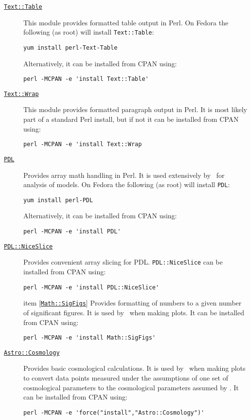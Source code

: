 \begin{description}
  \item [\href{http://search.cpan.org/~anno/Text-Table-1.114/lib/Text/Table.pm}{{\tt Text::Table}}] This module provides formatted table output in Perl. On Fedora the following (as root) will install {\tt Text::Table}:
\begin{verbatim}
yum install perl-Text-Table
\end{verbatim}
Alternatively, it can be installed from CPAN using:
\begin{verbatim}
perl -MCPAN -e 'install Text::Table'
\end{verbatim}
  \item [\href{http://search.cpan.org/~jhi/perl-5.8.0/lib/Text/Wrap.pm}{{\tt Text::Wrap}}] This module provides formatted paragraph output in Perl. It is most likely part of a standard Perl install, but if not it can be installed from CPAN using:
\begin{verbatim}
perl -MCPAN -e 'install Text::Wrap
\end{verbatim}
\item [\href{http://pdl.perl.org/}{{\tt PDL}}] Provides array math handling in Perl. It is used extensively by \glc\ for analysis of models. On Fedora the following (as root) will install {\tt PDL}:
\begin{verbatim}
yum install perl-PDL
\end{verbatim}
Alternatively, it can be installed from CPAN using:
\begin{verbatim}
perl -MCPAN -e 'install PDL'
\end{verbatim}

\item [\href{http://search.cpan.org/dist/PDL-NiceSlice/NiceSlice.pm}{{\tt PDL::NiceSlice}}] Provides convenient array slicing for PDL. {\tt PDL::NiceSlice} can be installed from CPAN using:
\begin{verbatim}
perl -MCPAN -e 'install PDL::NiceSlice'
\end{verbatim}

item [\href{http://search.cpan.org/~sbeck/Math-SigFigs-1.09/lib/Math/SigFigs.pod}{{\tt Math::SigFigs}}] Provides formatting of numbers to a given number of significant figures. It is used by \glc\ when making plots. It can be installed from CPAN using:
\begin{verbatim}
perl -MCPAN -e 'install Math::SigFigs'
\end{verbatim}

\item [\href{http://search.cpan.org/~djburke/Astro-Cosmology-0.90/Cosmology.pm}{{\tt Astro::Cosmology}}] Provides basic cosmological calculations. It is used by \glc\ when making plots to convert data points measured under the assumptions of one set of cosmological parameters to the cosmological parameters assumed by \glc. It can be installed from CPAN using:
\begin{verbatim}
perl -MCPAN -e 'force("install","Astro::Cosmology")'
\end{verbatim}
\end{description}

